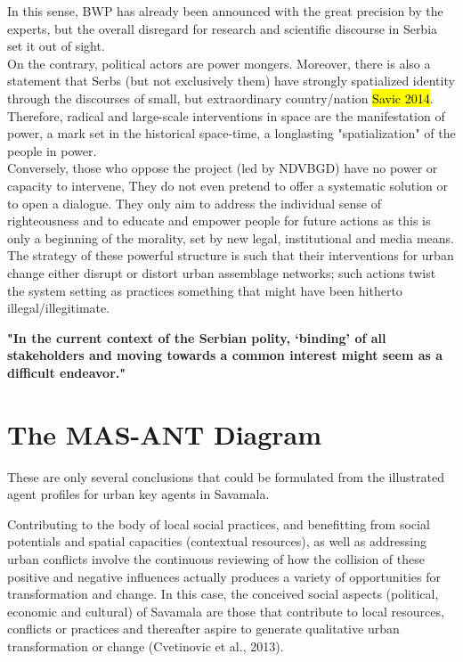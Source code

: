 \documentclass[11pt]{report}
\begin{document}
In this sense, BWP has already been announced with the great precision by the experts, but the overall disregard for research and scientific discourse in Serbia set it out of sight.
\\
On the contrary, political actors are power mongers.
Moreover, there is also a statement that Serbs (but not exclusively them) have strongly spatialized identity through the discourses of small, but extraordinary country/nation \hl{Savic 2014}.
Therefore, radical and large-scale interventions in space are the manifestation of power, a mark set in the historical space-time, a longlasting "spatialization" of the people in power.
\\
Conversely, those who oppose the project (led by NDVBGD) have no power or capacity to intervene, They do not even pretend to offer a systematic solution or to open a dialogue. They only aim to address the individual sense of righteousness and to educate and empower people for future actions as this is only a beginning of the morality, set by new legal, institutional and media means.
The strategy of these powerful structure is such that their interventions for urban change either disrupt or distort urban assemblage networks; such actions twist the system setting as practices something that might have been hitherto illegal/illegitimate.

\textbf{"In the current context  of  the  Serbian  polity,  ‘binding’  of  all stakeholders  and  moving  towards  a  common interest  might  seem  as  a  difficult  endeavor." \cite{Volic et al, 2012}}


\section{The MAS-ANT Diagram}

These are only several conclusions that could be formulated from the illustrated agent profiles for urban key agents in Savamala.

Contributing to the body of local social practices, and benefitting from social potentials and spatial capacities (contextual resources), as well as addressing urban conflicts involve the continuous reviewing of how the collision of these positive and negative influences actually produces a variety of opportunities for transformation and change. In this case, the conceived social aspects (political, economic and cultural) of Savamala are those that contribute to local resources, conflicts or practices and thereafter aspire to generate qualitative urban transformation or change (Cvetinovic et al., 2013). 
\end{document}
